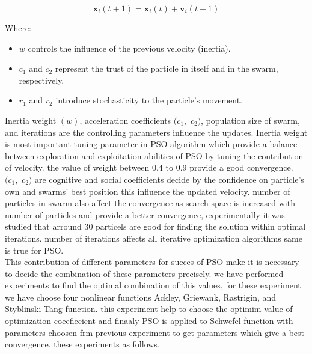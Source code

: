 \documentclass[paper,revised]{geophysics}
\begin{document}
\begin{equation}
	\label{eqn:pso2}
	\mathbf{x}_i(t+1) = \mathbf{x}_i(t) + \mathbf{v}_i(t+1)	
\end{equation}

Where:
\begin{itemize}
	\item \( w \) controls the influence of the previous velocity (inertia).
	\item \( c_1 \) and \( c_2 \) represent the trust of the particle in itself and in the swarm, respectively.
	\item \( r_1 \) and \( r_2 \) introduce stochasticity to the particle's movement.
\end{itemize}
Inertia weight \((w)\), acceleration coefficients \((c_1,\) \(c_2)\), population size of swarm, and iterations are the controlling parameters influence the updates. Inertia weight is most important tuning parameter in PSO algorithm which provide a balance between exploration and exploitation abilities of PSO by tuning the contribution of velocity. the value of weight between 0.4 to 0.9 provide a good convergence. \((c_1,\) \(c_2)\) are cognitive and social coefficients decide by the confidence on particle's own and swarms' best position this influence the updated velocity. number of particles in swarm also affect the convergence as search space is increased with number of particles and provide a better convergence, experimentally it was studied that arround 30 particels are good for finding the solution within optimal iterations. number of iterations affects all iterative optimization algorithms same is true for PSO.
\\
This contribution of different parameters for succes of PSO make it is necessary to decide the combination of these parameters precisely. we have performed experiments to find the optimal combination of this values, for these experiment we have choose four nonlinear functions Ackley, Griewank, Rastrigin, and Styblinski-Tang function. this experiment help to choose the optimim value of optimization coeefiecient and finaaly PSO is applied to Schwefel function with parameters choosen frm previous experiment to get parameters which give a best convergence. these experiments as follows.
\end{document}
